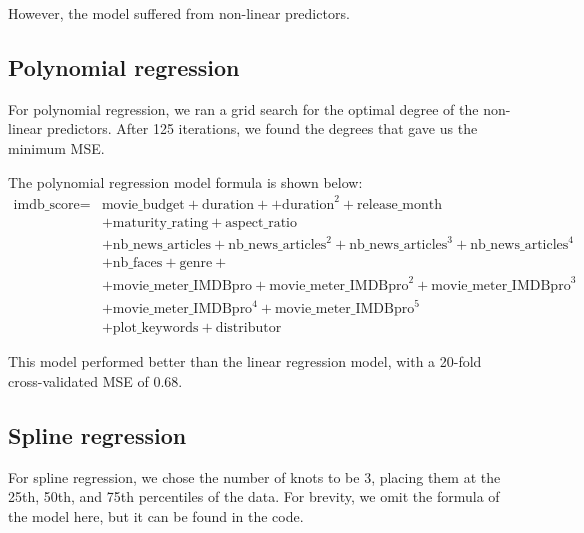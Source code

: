\documentclass[12pt,a4paper]{article}
\begin{document}
However, the model suffered from non-linear predictors.

\subsection{Polynomial regression}\label{subsec:polynomial-regression}
For polynomial regression, we ran a grid search for the optimal degree of the non-linear predictors.
After 125 iterations, we found the degrees that gave us the minimum MSE.

The polynomial regression model formula is shown below:
\begin{equation*}
    \begin{split}
        \text{imdb\_score} = & \text{movie\_budget} + \text{duration} + + \text{duration}^2 + \text{release\_month}                                  \\
                             & + \text{maturity\_rating} + \text{aspect\_ratio}                                                                      \\
                             & + \text{nb\_news\_articles} + \text{nb\_news\_articles}^2 + \text{nb\_news\_articles}^3 + \text{nb\_news\_articles}^4 \\
                             & + \text{nb\_faces} + \text{genre} +                                                                                   \\
                             & + \text{movie\_meter\_IMDBpro} + \text{movie\_meter\_IMDBpro}^2 + \text{movie\_meter\_IMDBpro}^3                      \\
                             & + \text{movie\_meter\_IMDBpro}^4 + \text{movie\_meter\_IMDBpro}^5                                                     \\
                             & + \text{plot\_keywords} + \text{distributor}
    \end{split}
\end{equation*}

This model performed better than the linear regression model, with a 20-fold cross-validated MSE of $0.68$.

\subsection{Spline regression}\label{subsec:spline-regression}
For spline regression, we chose the number of knots to be 3, placing them at the 25th, 50th, and 75th percentiles of the data.
For brevity, we omit the formula of the model here, but it can be found in the code.
\end{document}
